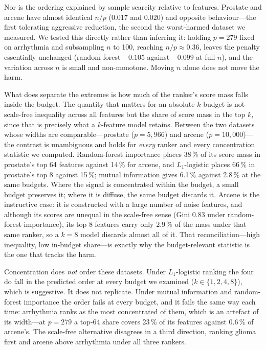 \documentclass[fleqn,10pt]{wlscirep}
\newcommand{\result}[1]{#1}
\begin{document}
Nor is the ordering explained by sample scarcity relative to features. Prostate and arcene have
almost identical $n/p$ (\result{0.017} and \result{0.020}) and opposite behaviour---the first
tolerating aggressive reduction, the second the worst-harmed dataset we measured. We tested this
directly rather than inferring it: holding $p=\result{279}$ fixed on arrhythmia and subsampling $n$
to \result{100}, reaching $n/p\approx\result{0.36}$, leaves the penalty essentially unchanged
(random forest \result{$-0.105$} against \result{$-0.099$} at full $n$), and the variation across
$n$ is small and non-monotone. Moving $n$ alone does not move the harm.

What does separate the extremes is how much of the ranker's score mass falls inside the budget. The
quantity that matters for an absolute-$k$ budget is not scale-free inequality across all features but
the share of score mass in the top $k$, since that is precisely what a $k$-feature model retains.
Between the two datasets whose widths are comparable---prostate ($p=\result{5{,}966}$) and arcene
($p=\result{10{,}000}$)---the contrast is unambiguous and holds for \emph{every} ranker and every
concentration statistic we computed. Random-forest importance places \result{38\,\%} of its score mass
in prostate's top \result{64} features against \result{14\,\%} for arcene, and $L_1$-logistic places
\result{66\,\%} in prostate's top \result{8} against \result{15\,\%}; mutual information gives
\result{6.1\,\%} against \result{2.8\,\%} at the same budgets. Where the signal is concentrated within
the budget, a small budget preserves it; where it is diffuse, the same budget discards it. Arcene is
the instructive case: it is constructed with a large number of noise features, and although its scores
are unequal in the scale-free sense (Gini \result{0.83} under random-forest importance), its top
\result{8} features carry only \result{2.9\,\%} of the mass under that same ranker, so a $k=8$ model
discards almost all of it. That
reconciliation---high inequality, low in-budget share---is exactly why the budget-relevant statistic is
the one that tracks the harm.

Concentration does \emph{not} order these datasets. Under $L_1$-logistic ranking the four do fall in the predicted
order at every budget we examined ($k\in\{1,2,4,8\}$), which is suggestive. It does not replicate. Under
mutual information and random-forest importance the order fails at every budget, and it fails the same
way each time: arrhythmia ranks as the most concentrated of them, which is an artefact of its
width---at $p=\result{279}$ a top-\result{64} share covers \result{23\,\%} of its features against
\result{0.6\,\%} of arcene's. The scale-free alternative disagrees in a third direction, ranking
glioma first and arcene above arrhythmia under all three rankers.
\end{document}
